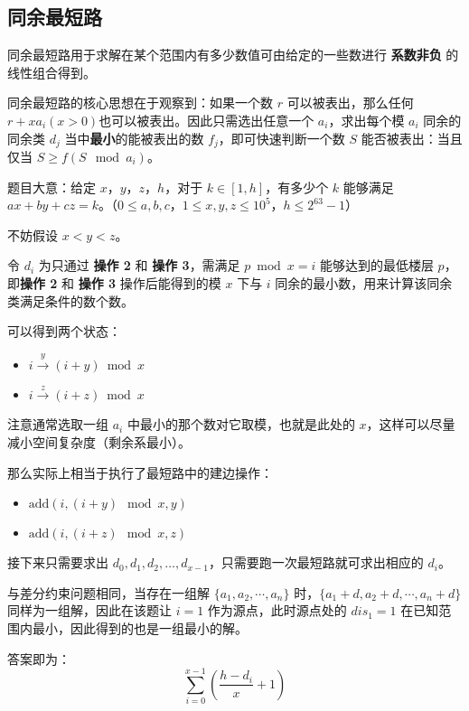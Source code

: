 \subsection{同余最短路}
\par \noindent 同余最短路用于求解在某个范围内有多少数值可由给定的一些数进行 \textbf{系数非负} 的线性组合得到。
~\\
\par \noindent 同余最短路的核心思想在于观察到：如果一个数 $r$ 可以被表出，那么任何 $r+xa_i(x>0)$也可以被表出。因此只需选出任意一个 $a_i$，求出每个模 $a_i$ 同余的同余类 $d_j$ 当中\textbf{最小}的能被表出的数 $f_j$，即可快速判断一个数 $S$ 能否被表出：当且仅当 $S≥f(S \mod a_i)$。

\begin{tcolorbox}
题目大意：给定 $x$，$y$，$z$，$h$，对于 $k \in [1,h]$，有多少个 $k$ 能够满足 $ax+by+cz=k$。（$0\leq a,b,c$，$1\le x,y,z\le 10^5$，$h\le 2^{63}-1$）
\end{tcolorbox}

\par \noindent 不妨假设 $x < y < z$。

\par \noindent 令 $d_i$ 为只通过 \textbf{操作 2} 和 \textbf{操作 3}，需满足 $p\bmod x = i$ 能够达到的最低楼层 $p$，即\textbf{操作 2} 和 \textbf{操作 3} 操作后能得到的模 $x$ 下与 $i$ 同余的最小数，用来计算该同余类满足条件的数个数。
~\\
\par \noindent 可以得到两个状态：
\begin{itemize}
\item $i \xrightarrow{y} (i+y) \bmod x$

\item $i \xrightarrow{z} (i+z) \bmod x$
\end{itemize}

\par \noindent 注意通常选取一组 $a_i$ 中最小的那个数对它取模，也就是此处的 $x$，这样可以尽量减小空间复杂度（剩余系最小）。
~\\
\par \noindent 那么实际上相当于执行了最短路中的建边操作：
\begin{itemize}
\item $\text{add}(i, (i+y) \mod x, y)$
\item $\text{add}(i, (i+z) \mod x, z)$
\end{itemize}

\par \noindent 接下来只需要求出 $d_0, d_1, d_2, \dots, d_{x-1}$，只需要跑一次最短路就可求出相应的 $d_i$。
~\\
\par \noindent 与差分约束问题相同，当存在一组解 $\{a_1,a_2,\cdots,a_n\}$ 时，$\{a_1+d,a_2+d,\cdots,a_n+d\}$ 同样为一组解，因此在该题让 $i=1$ 作为源点，此时源点处的 $dis_{1}=1$ 在已知范围内最小，因此得到的也是一组最小的解。

\par \noindent 答案即为：
$$
\sum_{i=0}^{x-1}\left(\frac{h-d_i}{x} + 1\right)
$$